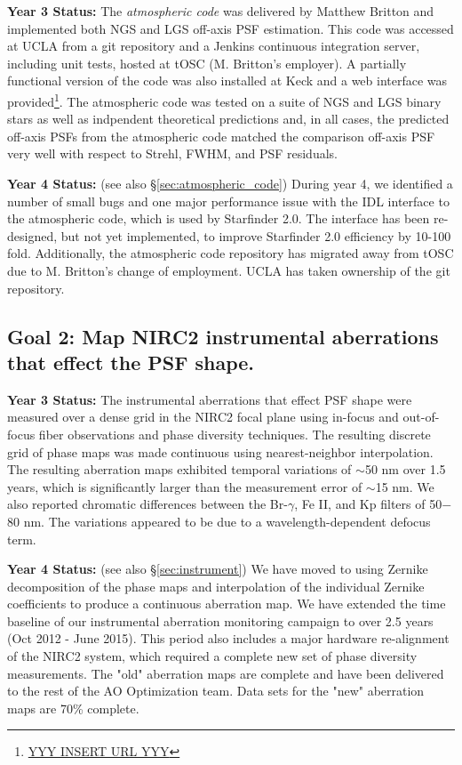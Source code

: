 \noindent
\textbf{Year 3 Status:}
The {\em atmospheric code} was delivered by Matthew Britton and
implemented both NGS and LGS off-axis PSF estimation. This code was
accessed at UCLA from a git repository and a Jenkins continuous
integration server, including unit tests, hosted at tOSC
(M. Britton's employer). A partially functional version of the code
was also installed at Keck and a web interface was 
provided\footnote{\url{YYY INSERT URL YYY}}.
The atmospheric code was tested on a suite of NGS and LGS
binary stars as well as indpendent theoretical predictions and, in
all cases, the predicted off-axis PSFs from the atmospheric code
matched the comparison off-axis PSF very well with respect to
Strehl, FWHM, and PSF residuals. 

\noindent
\textbf{Year 4 Status:} (see also \S\ref{sec:atmospheric_code})
During year 4, we identified a number of small bugs and one major
performance issue with the IDL interface to the atmospheric code, 
which is used by Starfinder 2.0. The interface has been re-designed, but not yet
implemented, to improve Starfinder 2.0 efficiency by 10-100
fold. Additionally, the atmospheric code repository has migrated away
from tOSC due to M. Britton's change of employment. UCLA has taken
ownership of the git repository. 


\subsection{Goal 2:  Map NIRC2 instrumental aberrations that effect the PSF
    shape.}

\noindent 
\textbf{Year 3 Status:}
The instrumental aberrations that effect PSF shape were measured over
a dense grid in the NIRC2 focal plane using in-focus and out-of-focus
fiber observations and phase diversity techniques. The resulting
discrete grid of phase maps was made continuous using nearest-neighbor
interpolation. The resulting aberration maps exhibited temporal
variations of $\sim$50 nm over 1.5 years, which is significantly
larger than the measurement error of $\sim$15 nm. We also reported 
chromatic differences between the Br-$\gamma$, Fe \textrm{II}, and Kp
filters of 50$-$80 nm. The variations appeared to be due to a
wavelength-dependent defocus term.
  
\noindent 
\textbf{Year 4 Status:} (see also \S\ref{sec:instrument})
We have moved to using Zernike decomposition of the phase maps and 
interpolation of the individual
Zernike coefficients to produce a continuous aberration map. 
We have extended the time baseline of our instrumental aberration
monitoring campaign to over 2.5 years (Oct 2012 - June 2015). This
period also includes a major hardware re-alignment of the NIRC2
system, which required a complete new set of phase diversity
measurements. The "old" aberration maps are complete and have been 
delivered to the rest of the AO Optimization team. Data sets for 
the "new" aberration maps are 70\% complete.

